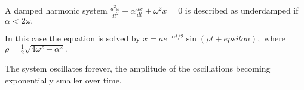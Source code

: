                          A damped harmonic system $ \frac{d^2 x}{dt^2} + \alpha \frac{dx}{dt} 
+ \omega ^2 x = 0  $ is described as underdamped if 
$ \alpha < 2 \omega . $ 
\par
In this case the equation is solved by
$ x = a e^{ - \alpha t / 2 } \sin ( \rho t + epsilon ) , $
where $ \rho = \frac{1}{2} \sqrt { 4 \omega ^2 - \alpha ^2 } . $
\par
The system oscillates forever, the amplitude of the oscillations
becoming exponentially smaller over time.
			